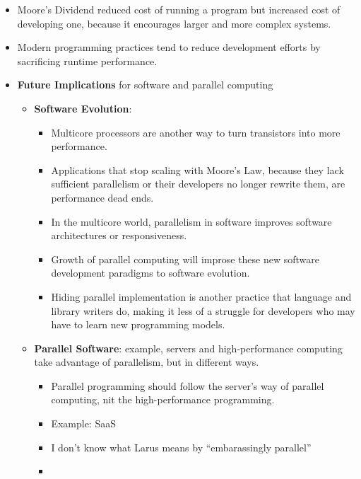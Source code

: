\documentclass [12pt]{article}
\begin{document}
\begin{itemize}
\begin{enumerate}
                \end{enumerate}
            \item Moore's Dividend reduced cost of running a program but increased cost of developing one, because it encourages larger and more complex systems. 
            \item Modern programming practices tend to reduce development efforts by sacrificing runtime performance. 
            \item \textbf{Future Implications} for software and parallel computing 
                \begin{itemize}
                    \item \textbf{Software Evolution}:
                        \begin{itemize}
                            \item Multicore processors are another way to turn transistors into more performance.
                            \item Applications that stop scaling with Moore's Law, because they lack sufficient parallelism or their developers no longer rewrite them, are performance dead ends.  
                            \item In the multicore world, parallelism in software improves software architectures or responsiveness. 
                            \item Growth of parallel computing will improse these new software development paradigms to software evolution. 
                            \item Hiding parallel implementation is another practice that language and library writers do, making it less of a struggle for developers who may have to learn new programming models. 
                        \end{itemize}
                    \item \textbf{Parallel Software}: example, servers and high-performance computing take advantage of parallelism, but in different ways.  
                        \begin{itemize}
                            \item Parallel programming should follow the server's way of parallel computing, nit the high-performance programming. 
                            \item Example: SaaS
                            \item I don't know what Larus means by ``embarassingly parallel''
                            \item 
                        \end{itemize}
                \end{itemize}
            

\end{itemize}
\end{document}
